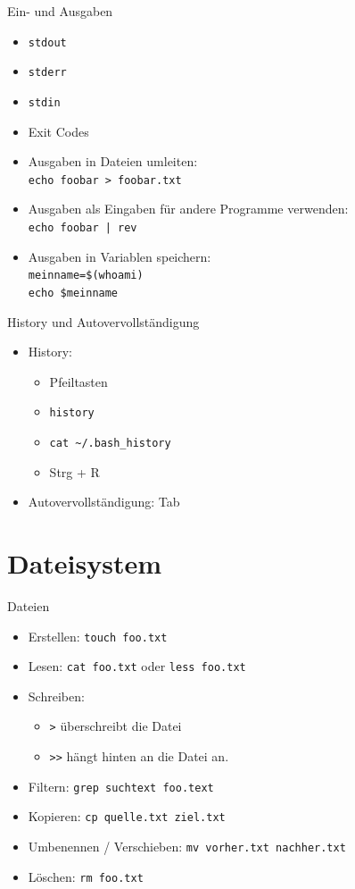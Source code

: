 \documentclass[compress]{beamer}
\begin{document}
\begin{frame}[fragile]{Ein- und Ausgaben}
\begin{itemize}
\item \verb+stdout+
\item \verb+stderr+
\item \verb+stdin+
\item Exit Codes
\item Ausgaben in Dateien umleiten:\\
\verb+echo foobar > foobar.txt+
\item Ausgaben als Eingaben für andere Programme verwenden: \\
\verb+echo foobar | rev+
\item Ausgaben in Variablen speichern:\\
\verb+meinname=$(whoami)+\\
\verb+echo $meinname+
\end{itemize}
\end{frame}

\begin{frame}[fragile]{History und Autovervollständigung}
\begin{itemize}
\item History:
\begin{itemize}
\item Pfeiltasten
\item \verb+history+
\item \verb+cat ~/.bash_history+
\item Strg + R
\end{itemize}
\item Autovervollständigung: Tab
\end{itemize}
\end{frame}

\section{Dateisystem}

\begin{frame}[fragile]{Dateien}
\begin{itemize}
\item Erstellen: \verb+touch foo.txt+
\item Lesen: \verb+cat foo.txt+ oder \verb+less foo.txt+
\item Schreiben:
\begin{itemize}
\item \verb+>+ überschreibt die Datei
\item \verb+>>+ hängt hinten an die Datei an.
\end{itemize}
\item Filtern: \verb+grep suchtext foo.text+
\item Kopieren: \verb+cp quelle.txt ziel.txt+
\item Umbenennen / Verschieben: \verb+mv vorher.txt nachher.txt+
\item Löschen: \verb+rm foo.txt+
\end{itemize}
\end{frame}
\end{document}
